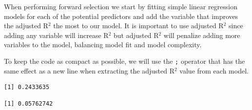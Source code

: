 \documentclass[
  letterpaper,
  DIV=11,
  numbers=noendperiod]{scrreprt}
\newenvironment{Shaded}{\begin{snugshade}}{\end{snugshade}}
\newcommand{\AttributeTok}[1]{\textcolor[rgb]{0.40,0.45,0.13}{#1}}
\newcommand{\FunctionTok}[1]{\textcolor[rgb]{0.28,0.35,0.67}{#1}}
\newcommand{\NormalTok}[1]{\textcolor[rgb]{0.00,0.23,0.31}{#1}}
\newcommand{\OtherTok}[1]{\textcolor[rgb]{0.00,0.23,0.31}{#1}}
\newcommand{\SpecialCharTok}[1]{\textcolor[rgb]{0.37,0.37,0.37}{#1}}
\begin{document}
When performing forward selection we start by fitting simple linear
regression models for each of the potential predictors and add the
variable that improves the adjusted R\(^2\) the most to our model. It is
important to use adjusted R\(^2\) since adding any variable will
increase R\(^2\) but adjusted R\(^2\) will penalize adding more
variables to the model, balancing model fit and model complexity.

To keep the code as compact as possible, we will use the \texttt{;}
operator that has the same effect as a new line when extracting the
adjusted R\(^2\) value from each model.

\begin{Shaded}
\end{Shaded}

\begin{verbatim}
[1] 0.2433635
\end{verbatim}

\begin{Shaded}
\end{Shaded}

\begin{verbatim}
[1] 0.05762742
\end{verbatim}

\begin{Shaded}
\end{Shaded}
\end{document}
